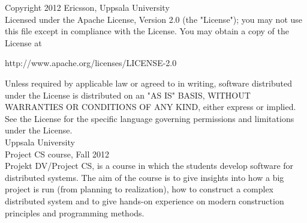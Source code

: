 Copyright 2012 Ericsson, Uppsala University\\

Licensed under the Apache License, Version 2.0 (the "License");
you may not use this file except in compliance with the License.
You may obtain a copy of the License at\\

    \begin{center}http://www.apache.org/licenses/LICENSE-2.0\end{center}

Unless required by applicable law or agreed to in writing, software
distributed under the License is distributed on an "AS IS" BASIS,
WITHOUT WARRANTIES OR CONDITIONS OF ANY KIND, either express or implied.
See the License for the specific language governing permissions and
limitations under the License.\\

Uppsala University\\
 
Project CS course, Fall 2012\\
 
Projekt DV/Project CS, is a course in which the students develop software for
distributed systems. The aim of the course is to give insights into how a big
project is run (from planning to realization), how to construct a complex
distributed system and to give hands-on experience on modern construction
principles and programming methods.
